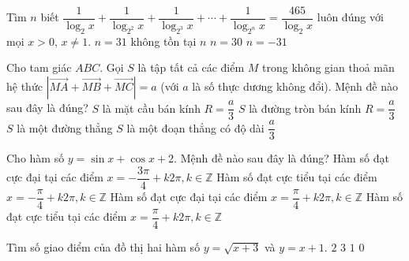 \begin{ex}%
Tìm $n$ biết $\dfrac{1}{\log_2 x}+\dfrac{1}{\log_{2^2}x}+\dfrac{1}{\log_{2^3}x} + \cdots + \dfrac{1}{\log_{2^n}x} =\dfrac{465}{\log_2 x}$ luôn đúng với mọi $x>0$, $x\ne 1$.
\choice
{$n=31$}
{không tồn tại $n$}
{\True $n=30$}
{$n=-31$}
\end{ex}

\begin{ex}%
Cho tam giác $ABC$. Gọi $S$ là tập tất cả các điểm $M$ trong không gian thoả mãn hệ thức $\left| \vec{MA}+\vec{MB}+\vec{MC} \right|=a$ (với $a$ là số thực dương không đổi). Mệnh đề nào sau đây là đúng?
\choice
{\True $S$ là mặt cầu bán kính $R=\dfrac{a}{3}$}
{$S$ là đường tròn bán kính $R=\dfrac{a}{3}$}
{$S$ là một đường thẳng}
{$S$ là một đoạn thẳng có độ dài $\dfrac{a}{3}$ }
\end{ex}

\begin{ex}%
Cho hàm số $y=\sin x+\cos x +2$. Mệnh đề nào sau đây là đúng?
\choice
{Hàm số đạt cực đại  tại các điểm $x=-\dfrac{3\pi}{4}+k2\pi, k\in\mathbb{Z}$}
{Hàm số đạt cực tiểu  tại các điểm $x=-\dfrac{\pi}{4}+k2\pi, k\in\mathbb{Z}$}
{\True Hàm số đạt cực đại tại các điểm $x=\dfrac{\pi}{4}+k2\pi, k\in\mathbb{Z}$}
{Hàm số đạt cực tiểu tại các điểm $x=\dfrac{\pi}{4}+k2\pi, k\in\mathbb{Z}$}
\end{ex}

\begin{ex}%
Tìm số giao điểm của đồ thị hai hàm số $y=\sqrt{x+3}$ và $y=x+1$.
\choice
{$2$}
{$3$}
{\True $1$}
{$0$}
\end{ex}

